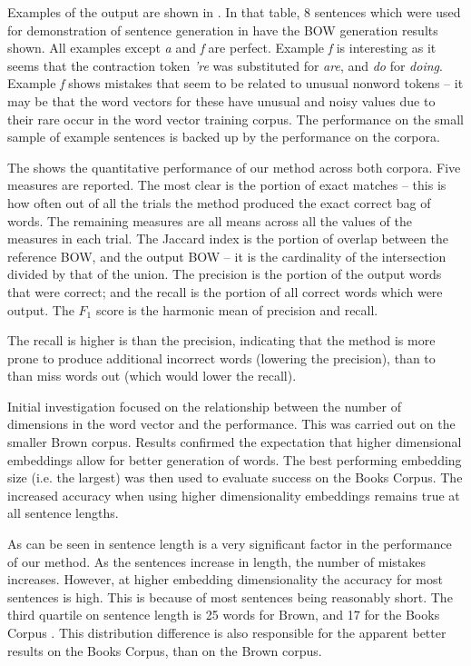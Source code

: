 \documentclass{llncs}
\begin{document}

Examples of the output are shown in . In that table, 8 sentences which were used for demonstration of sentence generation in \textcite{iyyer2014generating,Bowman2015SmoothGeneration} have the BOW generation results shown. All examples except \emph{a} and \emph{f} are perfect. Example \emph{f} is interesting as it seems that the contraction token \emph{'re} was substituted for \emph{are}, and \emph{do} for \emph{doing}. Example \emph{f} shows mistakes that seem to be related to unusual nonword tokens -- it may be that the word vectors for these have unusual and noisy values due to their rare occur in the word vector training corpus. The performance on the small sample of example sentences is backed up by the performance on the corpora. 

The  shows the quantitative performance of our method across both corpora. Five measures are reported. The most clear is the portion of exact matches -- this is how often out of all the trials the method produced the exact correct bag of words. The remaining measures are all means across all the values of the measures in each trial.  The Jaccard index is the portion of overlap between the reference BOW, and the output BOW -- it is the cardinality of the intersection divided by that of the union. The precision is the portion of the output words that were correct; and the recall is the portion of all correct words which were output. The $F_1$ score is the harmonic mean of precision and recall.

The recall is higher is than the precision, indicating that the method is more prone to produce additional incorrect words (lowering the precision), than to than miss words out (which would lower the recall). 

Initial investigation focused on the relationship between the number of dimensions in the word vector and the performance. This was carried out on the smaller Brown corpus. Results confirmed the expectation that higher dimensional embeddings allow for better generation of words. The best performing embedding size (i.e. the largest)  was then used to evaluate success on the Books Corpus. The increased accuracy when using higher dimensionality embeddings remains true at all sentence lengths.

As can be seen in  sentence length is a very significant factor in the performance of our method. As the sentences increase in length, the number of mistakes increases. However, at higher embedding dimensionality the accuracy for most sentences is high. This is because of most sentences being reasonably short. The third quartile on sentence length is 25 words for Brown, and 17 for the Books Corpus . This distribution difference is also responsible for the apparent better results on the Books Corpus, than on the Brown corpus.
\end{document}
